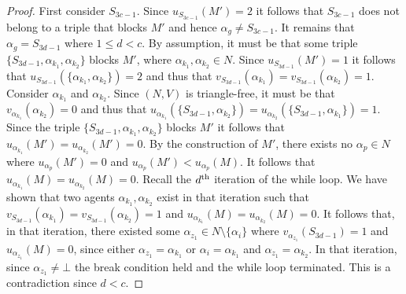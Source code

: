 \begin{proof}
First consider $S_{3c-1}$. Since $u_{S_{3c-1}}(M')=2$ it follows that $S_{3c-1}$ does not belong to a triple that blocks $M'$ and hence $\alpha_g\neq S_{3c-1}$. It remains that $\alpha_g = S_{3d-1}$ where $1\leq d < c$. By assumption, it must be that some triple $\{ S_{3d-1}, \alpha_{k_1}, \alpha_{k_2} \}$ blocks $M'$, where $\alpha_{k_1}, \alpha_{k_2} \in N$. Since $u_{S_{3d-1}}(M')=1$ it follows that $u_{S_{3d-1}}(\{ \alpha_{k_1}, \alpha_{k_2} \})=2$ and thus that $v_{S_{3d-1}}(\alpha_{k_1})=v_{S_{3d-1}}(\alpha_{k_2})=1$. Consider $\alpha_{k_1}$ and $\alpha_{k_2}$. Since $(N, V)$ is triangle-free, it must be that $v_{\alpha_{k_1}}(\alpha_{k_2}) = 0$ and thus that $u_{\alpha_{k_1}}(\{ S_{3d-1}, \alpha_{k_2} \})=u_{\alpha_{k_2}}(\{ S_{3d-1}, \alpha_{k_1} \})=1$. Since the triple $\{ S_{3d-1}, \alpha_{k_1}, \alpha_{k_2} \}$ blocks $M'$ it follows that $u_{\alpha_{k_1}}(M')=u_{\alpha_{k_2}}(M')=0$. By the construction of $M'$, there exists no $\alpha_p \in N$ where $u_{\alpha_p}(M') = 0$ and $u_{\alpha_p}(M') < u_{\alpha_p}(M)$. It follows that $u_{\alpha_{k_1}}(M)=u_{\alpha_{k_2}}(M)=0$. Recall the $d\textsuperscript{th}$ iteration of the while loop. We have shown that two agents $\alpha_{k_1}, \alpha_{k_2}$ exist in that iteration such that $v_{S_{3d-1}}(\alpha_{k_1})=v_{S_{3d-1}}(\alpha_{k_2})=1$ and $u_{\alpha_{k_1}}(M)=u_{\alpha_{k_2}}(M)=0$. It follows that, in that iteration, there existed some $\alpha_{z_1} \in N\setminus \{\alpha_i\}$ where $v_{\alpha_{z_1}}(S_{3d-1})=1$ and $u_{\alpha_{z_1}}(M)=0$, since either $\alpha_{z_1}=\alpha_{k_1}$ or $\alpha_{i}=\alpha_{k_1}$ and $\alpha_{z_1}=\alpha_{k_2}$. In that iteration, since $\alpha_{z_1}\neq \bot$ the break condition held and the while loop terminated. This is a contradiction since $d < c$.
\end{proof}

